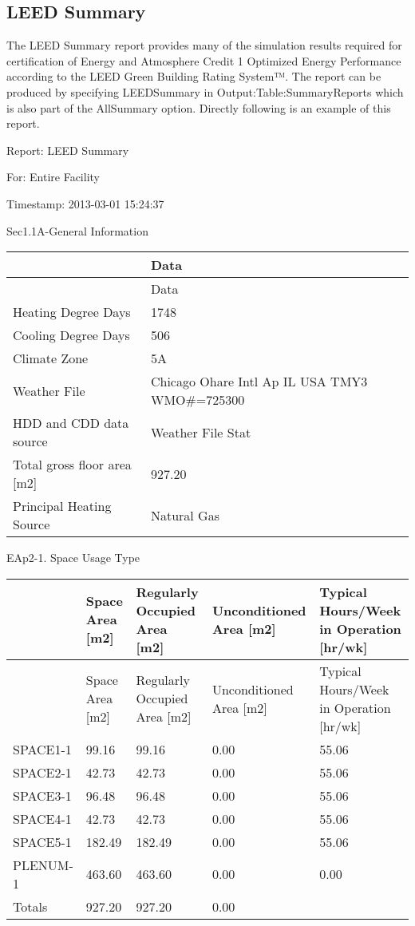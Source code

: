 \subsection{LEED Summary}\label{leed-summary}

The LEED Summary report provides many of the simulation results required for certification of Energy and Atmosphere Credit 1 Optimized Energy Performance according to the LEED Green Building Rating System™. The report can be produced by specifying LEEDSummary in Output:Table:SummaryReports which is also part of the AllSummary option. Directly following is an example of this report.

Report: LEED Summary

For: Entire Facility

Timestamp: 2013-03-01 15:24:37

Sec1.1A-General Information

\begin{longtable}[c]{>{\raggedright}p{2.21in}>{\raggedright}p{3.78in}}
\toprule 
 & Data \tabularnewline
\midrule
\endfirsthead

\toprule 
 & Data \tabularnewline
\midrule
\endhead

Heating Degree Days & 1748 \tabularnewline
Cooling Degree Days & 506 \tabularnewline
Climate Zone & 5A \tabularnewline
Weather File & Chicago Ohare Intl Ap IL USA TMY3 WMO\#=725300 \tabularnewline
HDD and CDD data source & Weather File Stat \tabularnewline
Total gross floor area [m2] & 927.20 \tabularnewline
Principal Heating Source & Natural Gas \tabularnewline
\bottomrule
\end{longtable}

EAp2-1. Space Usage Type

\begin{longtable}[c]{>{\raggedright}p{1.2in}>{\raggedright}p{1.2in}>{\raggedright}p{1.2in}>{\raggedright}p{1.2in}>{\raggedright}p{1.2in}}
\toprule 
 & Space Area [m2] & Regularly Occupied Area [m2] & Unconditioned Area [m2] & Typical Hours/Week in Operation [hr/wk] \tabularnewline
\midrule
\endfirsthead

\toprule 
 & Space Area [m2] & Regularly Occupied Area [m2] & Unconditioned Area [m2] & Typical Hours/Week in Operation [hr/wk] \tabularnewline
\midrule
\endhead

SPACE1-1 & 99.16 & 99.16 & 0.00 & 55.06 \tabularnewline
SPACE2-1 & 42.73 & 42.73 & 0.00 & 55.06 \tabularnewline
SPACE3-1 & 96.48 & 96.48 & 0.00 & 55.06 \tabularnewline
SPACE4-1 & 42.73 & 42.73 & 0.00 & 55.06 \tabularnewline
SPACE5-1 & 182.49 & 182.49 & 0.00 & 55.06 \tabularnewline
PLENUM-1 & 463.60 & 463.60 & 0.00 & 0.00 \tabularnewline
Totals & 927.20 & 927.20 & 0.00 & ~ \tabularnewline
\bottomrule
\end{longtable}

